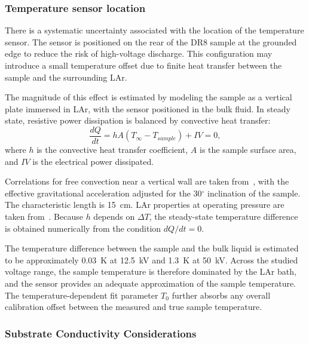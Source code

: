 \documentclass[a4paper,12pt]{article}
\newcommand{\DR}{DR8}
\begin{document}

\subsubsection{Temperature sensor location}

There is a systematic uncertainty associated with the location of the temperature sensor.
The sensor is positioned on the rear of the {\DR} sample at the grounded edge to reduce the risk of high-voltage discharge.
This configuration may introduce a small temperature offset due to finite heat transfer between the sample and the surrounding LAr.

The magnitude of this effect is estimated by modeling the sample as a vertical plate immersed in LAr, with the sensor positioned in the bulk fluid.
In steady state, resistive power dissipation is balanced by convective heat transfer:
\begin{equation}
\frac{dQ}{dt}=hA(T_{\infty}-T_{sample})+IV=0,
\end{equation}
where $h$ is the convective heat transfer coefficient, $A$ is the sample surface area, and $IV$ is the electrical power dissipated.

Correlations for free convection near a vertical wall are taken from~\cite{CHURCHILL19751323}, with the effective gravitational acceleration adjusted for the 30$^\circ$ inclination of the sample.
The characteristic length is \SI{15}{\centi\metre}.
LAr properties at operating pressure are taken from~\cite{GLADUN1971205,STREETT197459,nist}.
Because $h$ depends on $\Delta T$, the steady-state temperature difference is obtained numerically from the condition $dQ/dt=0$.

The temperature difference between the sample and the bulk liquid is estimated to be approximately \SI{0.03}{\kelvin} at \SI{12.5}{\kilo\volt} and \SI{1.3}{\kelvin} at \SI{50}{\kilo\volt}.
Across the studied voltage range, the sample temperature is therefore dominated by the LAr bath, and the sensor provides an adequate approximation of the sample temperature.
The temperature-dependent fit parameter $T_0$ further absorbs any overall calibration offset between the measured and true sample temperature.

\subsubsection{Substrate Conductivity Considerations}
\end{document}

